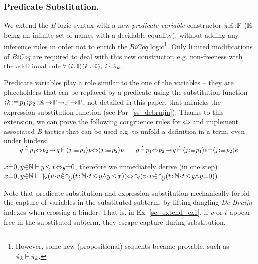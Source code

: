 \documentclass{llncs}
\begin{document}
\subsubsection{Predicate Substitution.} We extend the \emph{B} logic syntax with a new 
\emph{predicate variable} constructor $\dot{\pi}_{}\mathbb{K}\!:\!\mathbb{P}$ ($\mathbb{K}$ being an infinite 
set of names with a decidable equality), without adding any inference rules in order not to 
enrich the \emph{BiCoq} logic\footnote{However, some new (propositional) sequents became 
provable, such as ${\dot{\pi}_{k}}\:\dot{\vdash}\:{\dot{\pi}_{k}}$.}. Only limited modifications of \emph{BiCoq} 
are required to deal with this new constructor, e.g. non-freeness with the additional rule
$\forall\:(i\!:\!\mathbb{I})(k\!:\!\mathbb{K}),\:i\dot{\smallsetminus}\dot{\pi}_{k}$.

Predicate variables play a role similar to the one of the variables -- they are placeholders 
that can be replaced by a predicate using the substitution function
$\Baffprd{k}{p_1}{p_2}\!:\!\Bnamp\!\to\!\Bprd\!\to\!\Bprd\!\to\!\Bprd$, not detailed in this 
paper, that mimicks the expression substitution function (see Par. \ref{ss_debruijn}). Thanks 
to this extension, we can prove the following congruence rules for $\dot{\Leftrightarrow}$ and implement 
associated \emph{B} tactics that can be used e.g. to unfold a definition in a term, even under 
binders:
\[
\small
\begin{array}{ll}
\vspace{-16pt}\\
g\Binf p_1\piff p_2\!\to\!g\Binf \Baffprd{j}{p_1}{p} \piff \Baffprd{j}{p_2}{p}
\:\: & \:\:
g\Binf p_1\piff p_2\!\to\!g\Binf \Baffprd{j}{p_1}{e} \pequ \Baffprd{j}{p_2}{e}
\end{array}
\]

\begin{example}\label{sc_extend_ex1}\small
$x\dot{=} 0,y\dot{\in}\mathbb{N}\:\dot{\vdash}\: y\!\leq\!x \dot{\Leftrightarrow} y \dot{=} 0$, therefore we immediately derive (in one 
step)
$x\pequ 0,y\pins\NAT\Binf \Bbdfor{v}{v \pins \Bbdcmp{t}{\NAT}{t\!\leq\!y\pand y\!\leq\!x}}\piff
\Bbdfor{v}{v \pins \Bbdcmp{t}{\NAT}{t\!\leq\!y \pand y\pequ 0}}$
\end{example}
Note that predicate substitution and expression substitution mechanically forbid the capture 
of variables in the substituted subterm, by lifting dangling \emph{De Bruijn} indexes when 
crossing a binder. That is, in Ex. \ref{sc_extend_ex1}, if $v$ or $t$ appear free in the 
substituted subterm, they escape capture during substitution.
\end{document}
